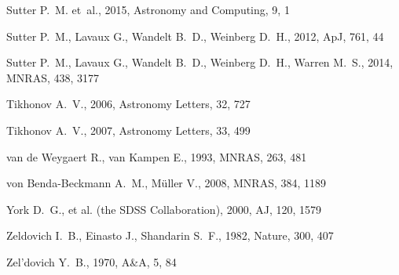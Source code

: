 \documentclass[a4,useAMS,usenatbib,usegraphicx]{mn2e}
\newcommand{\apj}{ApJ}
\newcommand{\aj}{AJ}
\newcommand{\mnras}{MNRAS}
\newcommand{\aap}{A\&A}
\newcommand{\nat}{Nature}
\begin{document}
\begin{thebibliography}{}
{Sutter} P.~M.  et~al., 2015, Astronomy and Computing, 9, 1

{Sutter} P.~M.,  {Lavaux} G.,  {Wandelt} B.~D.,    {Weinberg} D.~H.,  2012,
  \apj, 761, 44

{Sutter} P.~M.,  {Lavaux} G.,  {Wandelt} B.~D.,  {Weinberg} D.~H.,    {Warren}
  M.~S.,  2014, \mnras, 438, 3177

{Tikhonov} A.~V.,  2006, Astronomy Letters, 32, 727

{Tikhonov} A.~V.,  2007, Astronomy Letters, 33, 499

{van de Weygaert} R.,  {van Kampen} E.,  1993, \mnras, 263, 481

{von Benda-Beckmann} A.~M.,  {M{\"u}ller} V.,  2008, \mnras, 384, 1189

{York} D.~G.,  et al.   {(the SDSS Collaboration),} 2000, \aj, 120, 1579

{Zeldovich} I.~B.,  {Einasto} J.,    {Shandarin} S.~F.,  1982, \nat, 300, 407

{Zel'dovich} Y.~B.,  1970, \aap, 5, 84

\end{thebibliography}
\end{document}
